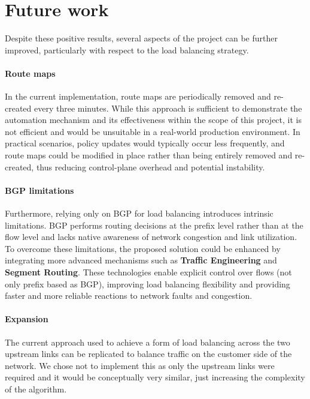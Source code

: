 \documentclass{report}
\begin{document}
\section{Future work}
Despite these positive results, several aspects of the project can be further improved, particularly with respect to the load balancing strategy.
\paragraph{Route maps}
In the current implementation, route maps are periodically removed and re-created every three minutes. 
While this approach is sufficient to demonstrate the automation mechanism and its effectiveness within the scope of this project, 
it is not efficient and would be unsuitable in a real-world production environment.
In practical scenarios, policy updates would typically occur less frequently, and route maps could be modified in place rather than being entirely removed and re-created, 
thus reducing control-plane overhead and potential instability.
\paragraph{BGP limitations}
Furthermore, relying only on BGP for load balancing introduces intrinsic limitations. 
BGP performs routing decisions at the prefix level rather than at the flow level and lacks native awareness of network congestion and link utilization. 
To overcome these limitations, the proposed solution could be enhanced by integrating more advanced mechanisms such as \textbf{Traffic Engineering} and \textbf{Segment Routing}. 
These technologies enable explicit control over flows (not only prefix based as BGP), improving load balancing flexibility and providing faster and more reliable reactions to network faults and congestion.
\paragraph{Expansion}
The current approach used to achieve a form of load balancing across the two upstream links can be replicated to balance traffic on the customer side of the network. We chose not to implement this as only the upstream links were required and it would be conceptually very similar, just increasing the complexity of the algorithm.
\end{document}
